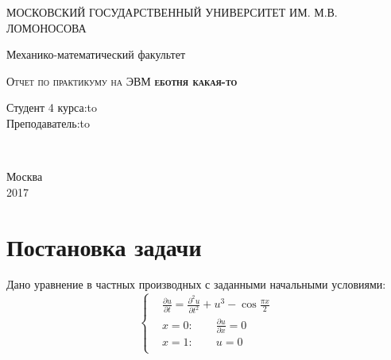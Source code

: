 \documentclass[12pt]{extarticle}
\numberwithin{equation}{section}
\begin{document}
\begin{titlepage} \newpage 
\begin{center} МОСКОВСКИЙ ГОСУДАРСТВЕННЫЙ УНИВЕРСИТЕТ ИМ. М.В. ЛОМОНОСОВА\end{center} 
\vspace{8em} \begin{center} 
\Large Механико-математический факультет \\ \end{center}
\vspace{2em} \begin{center} 
\textsc{Отчет по практикуму на ЭВМ \linebreak 
\textbf{еботня какая-то}} \end{center}
\vspace{6em} \newbox{\lbox}  
\newlength{\maxl} \setlength{\maxl}{\wd\lbox} \hfill\parbox{12	cm}
{ \hspace*{10cm}\hspace*{-5cm}Студент 4 курса:\hfill\hbox to\\
\hspace*{10cm}\hspace*{-5cm}Преподаватель:\hfill\hbox to}\\  \vspace{\fill}
\begin{center} Москва \\ 2017\end{center} \end{titlepage}


\tableofcontents
\renewcommand{\figurename}{График}
\renewcommand{\theequation}{\thesection.\arabic{equation}}


\newpage

\section{Постановка задачи} \label{sec:1-postanovka-zadachi}
Дано уравнение в частных производных с заданными начальными условиями:
\begin{equation}
\left\{
	\begin{aligned}
&\frac{\partial u}{\partial t} = \frac{\partial ^2 u}{\partial t^2} + u^3 - \cos \frac{\pi x}{2} \\
& x = 0: \qquad \frac{\partial u}{\partial x} = 0\\
& x = 1: \qquad u = 0 \\
	\end{aligned}
\right.
\label{eq:1-nachal-zadacha}
\end{equation}
\end{document}
